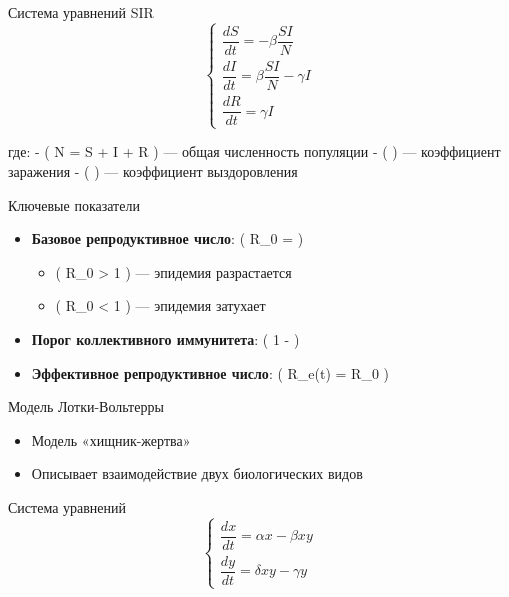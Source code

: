 \documentclass[
  ignorenonframetext,
  aspectratio=169,
  russian,
]{beamer}
\providecommand{\tightlist}{%
  \setlength{\itemsep}{0pt}\setlength{\parskip}{0pt}}\usepackage{longtable,booktabs,array}
\begin{document}
\begin{frame}{Система уравнений SIR}
\label{ux441ux438ux441ux442ux435ux43cux430-ux443ux440ux430ux432ux43dux435ux43dux438ux439-sir}
\[
\begin{cases}
\dfrac{dS}{dt} = -\beta \dfrac{S I}{N} \\[1em]
\dfrac{dI}{dt} = \beta \dfrac{S I}{N} - \gamma I \\[1em]
\dfrac{dR}{dt} = \gamma I
\end{cases}
\]

где: - ( N = S + I + R ) --- общая численность популяции - ( \beta ) ---
коэффициент заражения - ( \gamma ) --- коэффициент выздоровления
\end{frame}

\begin{frame}{Ключевые показатели}
\label{ux43aux43bux44eux447ux435ux432ux44bux435-ux43fux43eux43aux430ux437ux430ux442ux435ux43bux438}
\begin{itemize}[<+->]
\tightlist
\item
  \textbf{Базовое репродуктивное число}: ( R\_0 = \dfrac{\beta}{\gamma}
  )

  \begin{itemize}[<+->]
  \tightlist
  \item
    ( R\_0 \textgreater{} 1 ) --- эпидемия разрастается
  \item
    ( R\_0 \textless{} 1 ) --- эпидемия затухает
  \end{itemize}
\item
  \textbf{Порог коллективного иммунитета}: ( 1 -  )
\item
  \textbf{Эффективное репродуктивное число}: ( R\_e(t) = R\_0
  \cdot {} )
\end{itemize}
\end{frame}

\begin{frame}{Модель Лотки-Вольтерры}
\label{ux43cux43eux434ux435ux43bux44c-ux43bux43eux442ux43aux438-ux432ux43eux43bux44cux442ux435ux440ux440ux44b}
\begin{itemize}[<+->]
\tightlist
\item
  Модель «хищник-жертва»
\item
  Описывает взаимодействие двух биологических видов
\end{itemize}

\begin{block}{Система уравнений}
\label{ux441ux438ux441ux442ux435ux43cux430-ux443ux440ux430ux432ux43dux435ux43dux438ux439}
\[
\begin{cases}
\dfrac{dx}{dt} = \alpha x - \beta x y \\[1em]
\dfrac{dy}{dt} = \delta x y - \gamma y
\end{cases}
\]
\end{block}
\end{frame}
\end{document}
